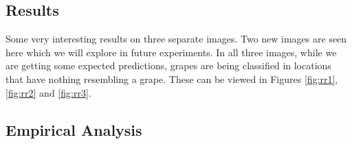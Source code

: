 \subsection*{Results}
Some very interesting results on three separate images. Two new images are seen
here which we will explore in future experiments. In all three images, while we
are getting some expected predictions, grapes are being classified in locations
that have nothing resembling a grape. These can be viewed in Figures
\ref{fig:rr1}, \ref{fig:rr2} and \ref{fig:rr3}.

\subsection*{Empirical Analysis}
